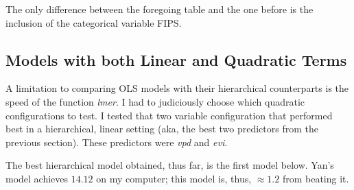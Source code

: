 \documentclass[a4paper]{article}
\begin{document}
\begin{remark}
    The only difference between the foregoing table and the one before is the inclusion of the categorical variable FIPS.
\end{remark}

\subsection{Models with both Linear and Quadratic Terms}
A limitation to comparing OLS models with their hierarchical counterparts is the speed of the function \textit{lmer}. I had to judiciously choose which quadratic configurations to test. I tested that two variable configuration that performed best in a hierarchical, linear setting (aka, the best two predictors from the previous section). These predictors were \textit{vpd} and \textit{evi}. 

The best hierarchical model obtained, thus far, is the first model below. Yan's model achieves $14.12$ on my computer; this model is, thus, $\approx 1.2$ from beating it.
\end{document}
